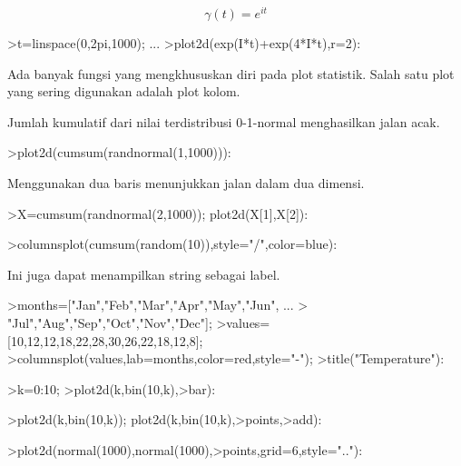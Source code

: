 \documentclass[a4paper,10pt]{article}
\begin{document}
\begin{eulernotebook}
\begin{eulercomment}
\begin{eulercomment}
\begin{eulercomment}
\begin{eulercomment}
\begin{eulercomment}
\begin{eulercomment}
\begin{eulercomment}
\begin{eulercomment}
\begin{eulercomment}
\begin{eulercomment}
\begin{eulercomment}
\begin{eulercomment}
\begin{eulercomment}
\begin{eulercomment}
\begin{eulercomment}
\end{eulercomment}
\begin{eulerformula}
\[
\gamma(t) = e^{it}
\]
\end{eulerformula}
\begin{eulerprompt}
>t=linspace(0,2pi,1000); ...
>plot2d(exp(I*t)+exp(4*I*t),r=2):
\end{eulerprompt}
\begin{eulercomment}
Ada banyak fungsi yang mengkhususkan diri pada plot statistik. Salah
satu plot yang sering digunakan adalah plot kolom.

Jumlah kumulatif dari nilai terdistribusi 0-1-normal menghasilkan
jalan acak.
\end{eulercomment}
\begin{eulerprompt}
>plot2d(cumsum(randnormal(1,1000))):
\end{eulerprompt}
\begin{eulercomment}
Menggunakan dua baris menunjukkan jalan dalam dua dimensi.
\end{eulercomment}
\begin{eulerprompt}
>X=cumsum(randnormal(2,1000)); plot2d(X[1],X[2]):
\end{eulerprompt}
\begin{eulerprompt}
>columnsplot(cumsum(random(10)),style="/",color=blue):
\end{eulerprompt}
\begin{eulercomment}
Ini juga dapat menampilkan string sebagai label.
\end{eulercomment}
\begin{eulerprompt}
>months=["Jan","Feb","Mar","Apr","May","Jun", ...
>  "Jul","Aug","Sep","Oct","Nov","Dec"];
>values=[10,12,12,18,22,28,30,26,22,18,12,8];
>columnsplot(values,lab=months,color=red,style="-");
>title("Temperature"):
\end{eulerprompt}
\begin{eulerprompt}
>k=0:10;
>plot2d(k,bin(10,k),>bar):
\end{eulerprompt}
\begin{eulerprompt}
>plot2d(k,bin(10,k)); plot2d(k,bin(10,k),>points,>add):
\end{eulerprompt}
\begin{eulerprompt}
>plot2d(normal(1000),normal(1000),>points,grid=6,style=".."):

\end{eulerprompt}
\end{eulercomment}
\end{eulercomment}
\end{eulercomment}
\end{eulercomment}
\end{eulercomment}
\end{eulercomment}
\end{eulercomment}
\end{eulercomment}
\end{eulercomment}
\end{eulercomment}
\end{eulercomment}
\end{eulercomment}
\end{eulercomment}
\end{eulercomment}
\end{eulernotebook}
\end{document}
